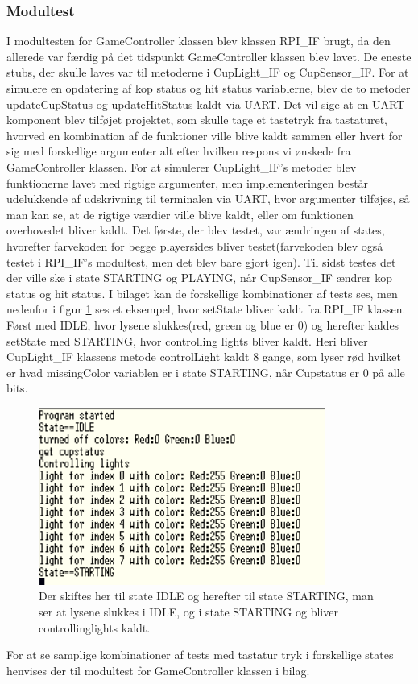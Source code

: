 \documentclass[Rapport/Playerside/GameController/GameController.tex]{subfiles}
\begin{document}
\subsubsection{Modultest}
I modultesten for GameController klassen blev klassen RPI\_IF brugt, da den allerede var færdig på det tidspunkt GameController klassen blev lavet. De eneste stubs, der skulle laves var til metoderne i CupLight\_IF og CupSensor\_IF. For at simulere en opdatering af kop status og hit status variablerne, blev de to metoder updateCupStatus og updateHitStatus kaldt via UART. Det vil sige at en UART komponent blev tilføjet projektet, som skulle tage et tastetryk fra tastaturet, hvorved en kombination af de funktioner ville blive kaldt sammen eller hvert for sig med forskellige argumenter alt efter hvilken respons vi ønskede fra GameController klassen. For at simulerer CupLight\_IF's metoder blev funktionerne lavet med rigtige argumenter, men implementeringen består udelukkende af udskrivning til terminalen via UART, hvor argumenter tilføjes, så man kan se, at de rigtige værdier ville blive kaldt, eller om funktionen overhovedet bliver kaldt. Det første, der blev testet, var ændringen af states, hvorefter farvekoden for begge playersides bliver testet(farvekoden blev også testet i RPI\_IF's modultest, men det blev bare gjort igen). Til sidst testes det der ville ske i state STARTING og PLAYING, når CupSensor\_IF ændrer kop status og hit status. I bilaget kan de forskellige kombinationer af tests ses, men nedenfor i figur \ref{fig:IDLE_STARTING} ses et eksempel, hvor setState bliver kaldt fra RPI\_IF klassen. Først med IDLE, hvor lysene slukkes(red, green og blue er 0) og herefter kaldes setState med STARTING, hvor controlling lights bliver kaldt. Heri bliver CupLight\_IF klassens metode controlLight kaldt 8 gange, som lyser rød hvilket er hvad missingColor variablen er i state STARTING, når Cupstatus er 0 på alle bits.
\begin{figure}
    \centering 
    \includegraphics[width=0.5\linewidth]{Rapport/Playerside/graphics/GameController/IDLE_STARTING.PNG}
    \caption{Der skiftes her til state IDLE og herefter til state STARTING, man ser at lysene slukkes i IDLE, og i state STARTING og bliver controllinglights kaldt.}
    \label{fig:IDLE_STARTING}
\end{figure}
For at se samplige kombinationer af tests med tastatur tryk i forskellige states henvises der til modultest for GameController klassen i bilag.
\end{document}
